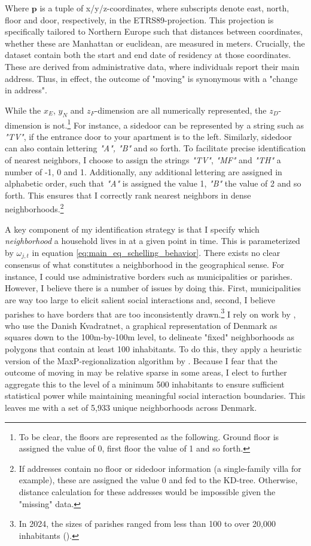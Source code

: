 \documentclass[main.tex]{subfiles}
\begin{document}
\noindent
Where $\textbf{p}$ is a tuple of x/y/z-coordinates, where subscripts denote east, north, floor and door, respectively, in the ETRS89-projection. This projection is specifically tailored to Northern Europe such that distances between coordinates, whether these are Manhattan or euclidean, are measured in meters. Crucially, the dataset contain both the start and end date of residency at those coordinates. These are derived from administrative data, where individuals report their main address. Thus, in effect, the outcome of "moving" is synonymous with a "change in address". 

While the $x_E$, $y_N$ and $z_F$-dimension are all numerically represented, the $z_D$-dimension is not.\footnote{To be clear, the floors are represented as the following. Ground floor is assigned the value of 0, first floor the value of 1 and so forth.} For instance, a sidedoor can be represented by a string such as \textit{"TV"}, if the entrance door to your apartment is to the left. Similarly, sidedoor can also contain lettering \textit{"A", "B"} and so forth. To facilitate precise identification of nearest neighbors, I choose to assign the strings \textit{"TV"}, \textit{"MF"} and \textit{"TH"} a number of -1, 0 and 1. Additionally, any additional lettering are assigned in alphabetic order, such that \textit{"A"} is assigned the value 1, \textit{"B"} the value of 2 and so forth. This ensures that I correctly rank nearest neighbors in dense neighborhoods.\footnote{If addresses contain no floor or sidedoor information (a single-family villa for example), these are assigned the value 0 and fed to the KD-tree. Otherwise, distance calculation for these addresses would be impossible given the "missing" data.}

A key component of my identification strategy is that I specify which \textit{neighborhood} a household lives in at a given point in time. This is parameterized by $\omega_{j,t}$ in equation \ref{eq:main_eq_schelling_behavior}. There exists no clear consensus of what constitutes a neighborhood in the geographical sense. For instance, I could use administrative borders such as municipalities or parishes. However, I believe there is a number of issues by doing this. First, municipalities are way too large to elicit salient social interactions and, second, I believe parishes to have borders that are too inconsistently drawn.\footnote{In 2024, the sizes of parishes ranged from less than 100 to over 20,000 inhabitants (\textcite{dst_sogn_stats}).} I rely on work by \textcite{nabolagsatlas_neighborhoods_boje2023}, who use the Danish Kvadratnet, a graphical representation of Denmark as squares down to the 100m-by-100m level, to delineate "fixed" neighborhoods as polygons that contain at least 100 inhabitants. To do this, they apply a heuristic version of the MaxP-regionalization algorithm by \textcite{maxp_heuristic_wei2021efficient}. Because I fear that the outcome of moving in may be relative sparse in some areas, I elect to further aggregate this to the level of a minimum 500 inhabitants to ensure sufficient statistical power while maintaining meaningful social interaction boundaries. This leaves me with a set of 5,933 unique neighborhoods across Denmark.
\end{document}
